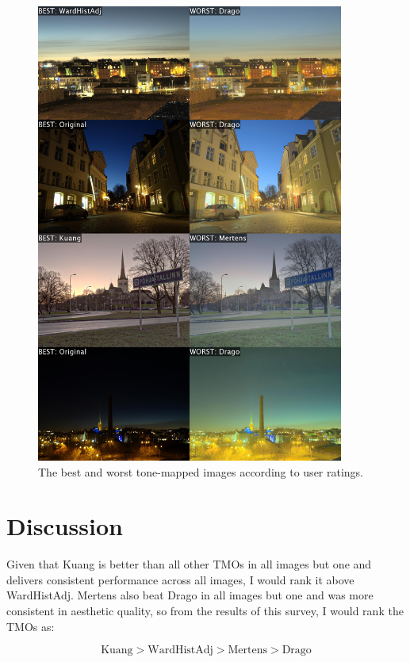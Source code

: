 \documentclass[a4paper]{scrartcl}
\begin{document}
\begin{figure}[p]
\centering
\includegraphics[width=0.9\textwidth]{../images/best_worst.jpg}
\caption{The best and worst tone-mapped images according to user ratings.}
\label{fig:best_worst_images}
\end{figure}

\section{Discussion} 


Given that Kuang is better than all other TMOs in all images but one and delivers consistent performance across all images, I would rank it above WardHistAdj. Mertens also beat Drago in all images but one and was more consistent in aesthetic quality, so from the results of this survey, I would rank the TMOs as:

$$\textrm{Kuang} > \textrm{WardHistAdj} > \textrm{Mertens} > \textrm{Drago}$$
\end{document}
